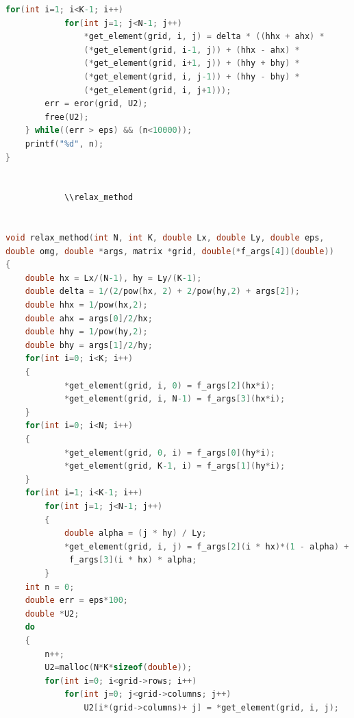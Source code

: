 \documentclass[12pt]{article}
\begin{document}
\begin{enumerate}
\begin{lstlisting}[language=C]
        for(int i=1; i<K-1; i++)
            for(int j=1; j<N-1; j++)
                *get_element(grid, i, j) = delta * ((hhx + ahx) * 
                (*get_element(grid, i-1, j)) + (hhx - ahx) * 
                (*get_element(grid, i+1, j)) + (hhy + bhy) * 
                (*get_element(grid, i, j-1)) + (hhy - bhy) * 
                (*get_element(grid, i, j+1)));
        err = eror(grid, U2);
        free(U2);
    } while((err > eps) && (n<10000));
    printf("%d", n);
}


            \\relax_method


void relax_method(int N, int K, double Lx, double Ly, double eps,
double omg, double *args, matrix *grid, double(*f_args[4])(double))
{
    double hx = Lx/(N-1), hy = Ly/(K-1);
    double delta = 1/(2/pow(hx, 2) + 2/pow(hy,2) + args[2]);
    double hhx = 1/pow(hx,2);
    double ahx = args[0]/2/hx;
    double hhy = 1/pow(hy,2);
    double bhy = args[1]/2/hy;
    for(int i=0; i<K; i++)
    {
            *get_element(grid, i, 0) = f_args[2](hx*i);
            *get_element(grid, i, N-1) = f_args[3](hx*i);
    }
    for(int i=0; i<N; i++)
    {
            *get_element(grid, 0, i) = f_args[0](hy*i);
            *get_element(grid, K-1, i) = f_args[1](hy*i);
    }   
    for(int i=1; i<K-1; i++)
        for(int j=1; j<N-1; j++)
        {
            double alpha = (j * hy) / Ly;
            *get_element(grid, i, j) = f_args[2](i * hx)*(1 - alpha) +
             f_args[3](i * hx) * alpha;
        }
    int n = 0;
    double err = eps*100;
    double *U2;
    do
    {
        n++;
        U2=malloc(N*K*sizeof(double));
        for(int i=0; i<grid->rows; i++)
            for(int j=0; j<grid->columns; j++)
                U2[i*(grid->columns)+ j] = *get_element(grid, i, j);
        

\end{lstlisting}
\end{enumerate}
\end{document}
